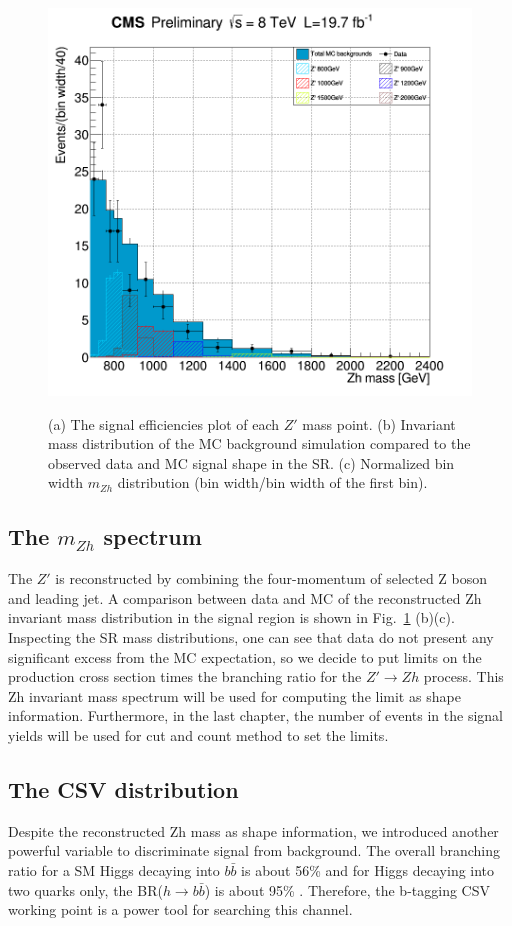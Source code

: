 \begin{figure}[hbtp]
{    \includegraphics[scale=0.22]{figure/CH3/h_sigXMass_new.png}}
  \caption{\label{fig:SIG_eff_spectrum}(a) The signal efficiencies plot of each $Z'$ mass point. (b) Invariant mass distribution of the MC background simulation compared to the observed data and MC signal shape in the SR. (c) Normalized bin width $m_{Zh}$ distribution (bin width/bin width of the first bin).}
\end{figure}

\subsection{The $m_{Zh}$ spectrum}
The $Z'$ is reconstructed by combining the four-momentum of selected Z boson and leading jet. A comparison between data and MC of the reconstructed Zh invariant mass distribution in the signal region is shown in Fig.~\ref{fig:SIG_eff_spectrum} (b)(c). Inspecting the SR mass distributions, one can see that data do not present any significant excess from the MC expectation, so we decide to put limits on the production cross section times the branching ratio for the $Z' \rightarrow Zh$ process. This Zh invariant mass spectrum will be used for computing the limit as shape information. Furthermore, in the last chapter, the number of events in the signal yields will be used for cut and count method to set the limits.

\newpage
\subsection{The CSV distribution}
Despite the reconstructed Zh mass as shape information, we introduced another powerful variable to discriminate signal from background. The overall branching ratio for a SM Higgs decaying into $b\bar{b}$ is about 56\% and for Higgs decaying into two quarks only, the BR($h\rightarrow b\bar{b}$) is about 95\% \cite{HiggsBR}. Therefore, the b-tagging CSV working point is a power tool for searching this channel.

